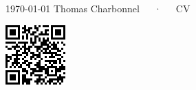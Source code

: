 \documentclass[11pt, a4paper]{awesome-cv}
\begin{document}
\makecvheader[C]

\makecvfooter
  {\today}
  {Thomas Charbonnel~~~·~~~CV}
  {\thepage}


\vspace{1cm}

\begin{minipage}[t]{.62\textwidth}
  
  
  
\end{minipage}\hfill\vline\hfill%
\begin{minipage}[t]{.34\textwidth}
  
  
  \vspace{5cm}
  \begin{center}
    \includegraphics{qrcode}
  \end{center}
\end{minipage}


\end{document}
